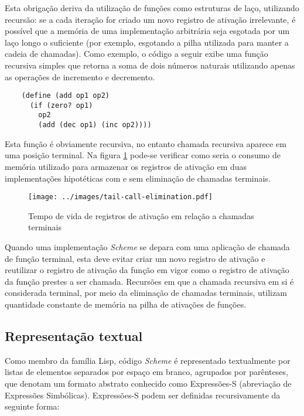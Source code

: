 Esta obrigação deriva da utilização de funções como estruturas de laço,
utilizando recursão: se a cada iteração for criado um novo registro de ativação
irrelevante, é possível que a memória de uma implementação arbitrária seja
esgotada por um laço longo o suficiente (por exemplo, esgotando a pilha
utilizada para manter a cadeia de chamadas). Como exemplo, o código a seguir
exibe uma função recursiva simples que retorna a soma de dois números naturais
utilizando apenas as operações de incremento e decremento.

\begin{lstlisting}
    (define (add op1 op2)
      (if (zero? op1)
        op2
        (add (dec op1) (inc op2))))
\end{lstlisting}

Esta função é obviamente recursiva, no entanto chamada recursiva aparece em uma
posição terminal. Na figura \ref{fig:tail-call-elimination} pode-se verificar
como seria o consumo de memória utilizado para armazenar os registros de
ativação em duas implementações hipotéticas com e sem eliminação de chamadas
terminais.

\begin{figure}[h!]
\centering
\texttt{[image: ../images/tail-call-elimination.pdf]}
\caption{Tempo de vida de registros de ativação em relação a chamadas terminais}
\label{fig:tail-call-elimination}
\end{figure}

Quando uma implementação \textit{Scheme} se depara com uma aplicação de chamada
de função terminal, esta deve evitar criar um novo registro de ativação e
reutilizar o registro de ativação da função em vigor como o registro de
ativação da função prestes a ser chamada. Recursões em que a chamada recursiva
em si é considerada terminal, por meio da eliminação de chamadas terminais,
utilizam quantidade constante de memória na pilha de ativações de funções.

\subsection{Representação textual}

Como membro da família Lisp, código
\textit{Scheme} é representado textualmente por listas de elementos separados
por espaço em branco, agrupados por parênteses, que denotam um formato abstrato
conhecido como Expressões-S (abreviação de Expressões Simbólicas). Expressões-S
podem ser definidas recursivamente da seguinte forma:

